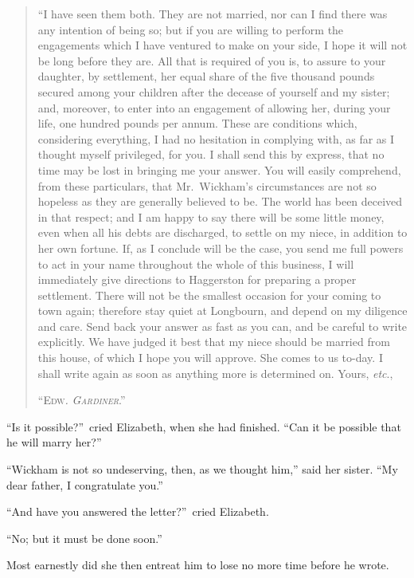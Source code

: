 \documentclass[12pt,english]{book}
\newcommand{\noun}[1]{\textsc{#1}}
\begin{document}
\begin{quotation}
\noindent {}``I have seen them both. They are not married, nor can
I find there was any intention of being so; but if you are willing
to perform the engagements which I have ventured to make on your side,
I hope it will not be long before they are. All that is required of
you is, to assure to your daughter, by settlement, her equal share
of the five thousand pounds secured among your children after the
decease of yourself and my sister; and, moreover, to enter into an
engagement of allowing her, during your life, one hundred pounds per
annum. These are conditions which, considering everything, I had no
hesitation in complying with, as far as I thought myself privileged,
for you. I shall send this by express, that no time may be lost in
bringing me your answer. You will easily comprehend, from these particulars,
that Mr.\ Wickham's circumstances are not so hopeless as they are
generally believed to be. The world has been deceived in that respect;
and I am happy to say there will be some little money, even when all
his debts are discharged, to settle on my niece, in addition to her
own fortune. If, as I conclude will be the case, you send me full
powers to act in your name throughout the whole of this business,
I will immediately give directions to Haggerston for preparing a proper
settlement. There will not be the smallest occasion for your coming
to town again; therefore stay quiet at Longbourn, and depend on my
diligence and care. Send back your answer as fast as you can, and
be careful to write explicitly. We have judged it best that my niece
should be married from this house, of which I hope you will approve.
She comes to us to-day. I shall write again as soon as anything more
is determined on. Yours, \textit{etc}.,

``\noun{Edw}\emph{\noun{.}} \textit{\emph{\noun{Gardiner}}}.'' 
\end{quotation}
{}``Is it possible?''\ cried Elizabeth, when she had finished.
{}``Can it be possible that he will marry her?''\ 

{}``Wickham is not so undeserving, then, as we thought him,'' said
her sister. {}``My dear father, I congratulate you.''

{}``And have you answered the letter?''\ cried Elizabeth.

{}``No; but it must be done soon.''

Most earnestly did she then entreat him to lose no more time before
he wrote.
\end{document}
